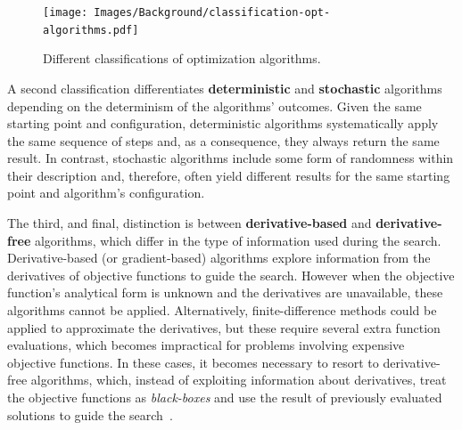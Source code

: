	\begin{figure}
		\centering
		\texttt{[image: Images/Background/classification-opt-algorithms.pdf]}
		\caption{Different classifications of optimization algorithms.}
		\label{fig:optALGOclassification}
	\end{figure}
	
	A second classification differentiates \textbf{deterministic} and \textbf{stochastic} algorithms depending on the determinism of the algorithms' outcomes. Given the same starting point and configuration, deterministic algorithms systematically apply the same sequence of steps and, as a consequence, they always return the same result. In contrast, stochastic algorithms include some form of randomness within their description and, therefore, often yield different results for the same starting point and algorithm's configuration.
		
	The third, and final, distinction is between \textbf{derivative-based} and \textbf{derivative-free} algorithms, which differ in the type of information used during the search. Derivative-based (or gradient-based) algorithms explore information from the derivatives of objective functions to guide the search. %
	However when the objective function's analytical form is unknown and the derivatives are unavailable, these algorithms cannot be applied. Alternatively, finite-difference methods could be applied to approximate the derivatives, but these require several extra function evaluations, which becomes impractical for problems involving expensive objective functions. In these cases, it becomes necessary to resort to derivative-free algorithms, which, instead of exploiting information about derivatives, treat the objective functions as \textit{black-boxes} and use the result of previously evaluated solutions to guide the search~\cite{Rios2013}.
	
	
